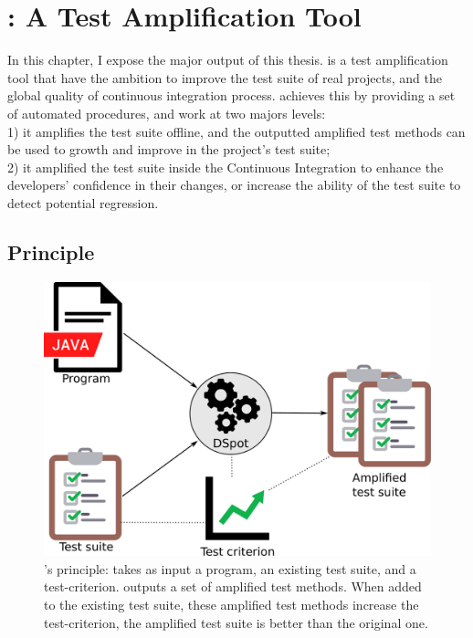 \chapter{\dspot: A Test Amplification Tool}
\label{chapter:dspot}

\begin{chaptersummary}
		In this chapter, I expose the major output of this thesis. \dspot is a test amplification tool that have the ambition to improve the test suite of real projects, and the global quality of continuous integration process.
		\dspot achieves this by providing a set of automated procedures, and work at two majors levels:\\
		1) it amplifies the test suite offline, and the outputted amplified test methods can be used to growth and improve in the project's test suite;\\
		2) it amplified the test suite inside the Continuous Integration to enhance the developers' confidence in their changes, or increase the ability of the test suite to detect potential regression.
\end{chaptersummary}

\minitoc

\graphicspath{{.}{chapitres/dspot/}}


\section{Principle}
\label{sec:dspot:principle}

\begin{figure}[h]
	\centering
	\includegraphics[width=.6\linewidth]{dspot_principle.pdf}
	\caption{
		\dspot's principle: \dspot takes as input a program, an existing test suite, and a test-criterion. 
		\dspot outputs a set of amplified test methods.
		When added to the existing test suite, these amplified test methods increase the test-criterion, \ie the amplified test suite is better than the original one.
	}
	\label{fig:dspot:principle}
\end{figure}

